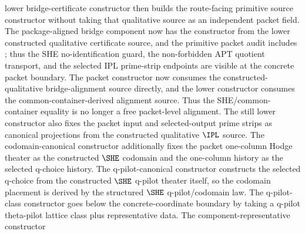 \begin{proposition}
  lower bridge-certificate constructor
  then builds the route-facing primitive source constructor without taking that
  qualitative source as an independent packet field.  The package-aligned
  bridge component now has the constructor
  from the lower constructed qualitative certificate source, and the primitive
  packet audit includes
  ;
  thus the SHE no-identification guard, the non-forbidden APT quotient transport,
  and the selected IPL prime-strip endpoints are visible at the concrete packet
  boundary.  The packet constructor
  now consumes the constructed-qualitative bridge-alignment source directly, and
  the lower constructor
  consumes the common-container-derived alignment source.  Thus the
  SHE/common-container equality is no longer a free packet-level alignment.  The
  still lower constructor
  also fixes the packet input and selected-output prime strips as canonical
  projections from the constructed qualitative \(\IPL\) source.  The
  codomain-canonical constructor
  additionally fixes the packet one-column Hodge theater as the constructed
  \(\SHE\) codomain and the one-column history as the selected q-choice history.
  The q-pilot-canonical constructor
  constructs the selected q-choice from the constructed \(\SHE\) q-pilot
  theater itself, so the codomain placement is derived by the structured
  \(\SHE\) q-pilot/codomain law.  The q-pilot-class constructor
  goes below the concrete-coordinate boundary by taking a q-pilot theta-pilot
  lattice class plus representative data.  The component-representative
  constructor

\end{proposition}
